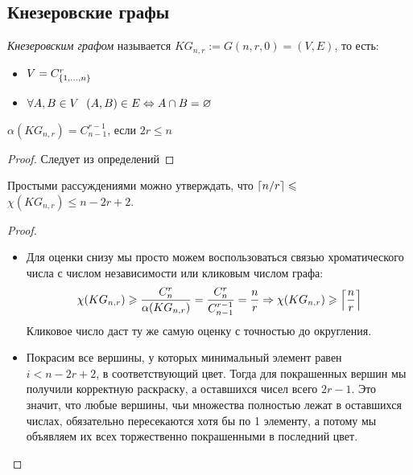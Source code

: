\subsection{Кнезеровские графы}

\begin{definition}
	\textit{Кнезеровским графом} называется $KG_{n, r} := G(n, r, 0) = (V, E)$, то есть:
	\begin{itemize}
		\item $V = C_{\{1, \ldots, n\}}^r$
		
		\item $\forall A, B \in V\ \ (A, B) \in E \Leftrightarrow A \cap B = \varnothing$
	\end{itemize}
\end{definition}

\begin{proposition}
	$\alpha(KG_{n, r}) = C_{n-1}^{r-1}$, если $2r \le n$
\end{proposition}

\begin{proof}
	Следует из определений
\end{proof}

\begin{proposition}
	Простыми рассуждениями можно утверждать, что $\left\lceil n / r \right\rceil \leqslant$ \\ $\chi(KG_{n, r}) \le n - 2r + 2$.
\end{proposition}

\begin{proof}~
	\begin{itemize}
		\item Для оценки снизу мы просто можем воспользоваться связью хроматического числа с числом независимости или кликовым числом графа:
		\[
			\chi(KG_{n, r}) \geqslant \frac{C_n^r}{\alpha(KG_{n, r})} = \frac{C_n^r}{C_{n - 1}^{r - 1}} = \frac{n}{r} \Rightarrow \chi(KG_{n, r}) \geqslant \left\lceil \frac{n}{r} \right\rceil
		\]
		Кликовое число даст ту же самую оценку с точностью до округления.
		
		\item Покрасим все вершины, у которых минимальный элемент равен $i < n - 2r + 2$, в соответствующий цвет. Тогда для покрашенных вершин мы получили корректную раскраску, а оставшихся чисел всего $2r - 1$. Это значит, что любые вершины, чьи множества полностью лежат в оставшихся числах, обязательно пересекаются хотя бы по 1 элементу, а потому мы объявляем их всех торжественно покрашенными в последний цвет.
	\end{itemize}
\end{proof}

